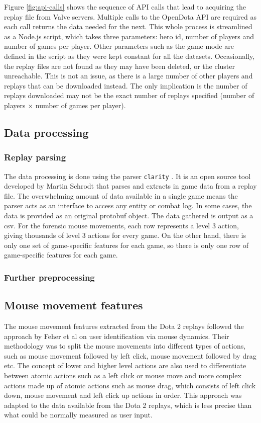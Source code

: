 \documentclass[Report.tex]{subfiles}
\begin{document}
Figure \ref{fig:api-calls} shows the sequence of API calls that lead to acquiring the replay file from Valve servers. Multiple calls to the OpenDota API are required as each call returns the data needed for the next. This whole process is streamlined as a Node.js script, which takes three parameters: hero id, number of players and number of games per player. Other parameters such as the game mode are defined in the script as they were kept constant for all the datasets. Occasionally, the replay files are not found as they may have been deleted, or the cluster unreachable. This is not an issue, as there is a large number of other players and replays that can be downloaded instead. The only implication is the number of replays downloaded may not be the exact number of replays specified (number of players $\times$ number of games per player).

\subsection{Data processing}

\subsubsection{Replay parsing}
The data processing is done using the parser \texttt{clarity} \cite{clarity}. It is an open source tool developed by Martin Schrodt that parses and extracts in game data from a replay file. The overwhelming amount of data available in a single game means the parser acts as an interface to access any entity or combat log. In some cases, the data is provided as an original protobuf object. The data gathered is output as a csv. For the forensic mouse movements, each row represents a level 3 action, giving thousands of level 3 actions for every game. On the other hand, there is only one set of game-specific features for each game, so there is only one row of game-specific features for each game.

\subsubsection{Further preprocessing}

\subsection{Mouse movement features}\label{sec:mm-features}
The mouse movement features extracted from the Dota 2 replays followed the approach by Feher et al \cite{mouse-dynamics} on user identification via mouse dynamics. Their methodology was to split the mouse movements into different types of actions, such as mouse movement followed by left click, mouse movement followed by drag etc. The concept of lower and higher level actions are also used to differentiate between atomic actions such as a left click or mouse move and more complex actions made up of atomic actions such as mouse drag, which consists of left click down, mouse movement and left click up actions in order. This approach was adapted to the data available from the Dota 2 replays, which is less precise than what could be normally measured as user input. 
\end{document}
